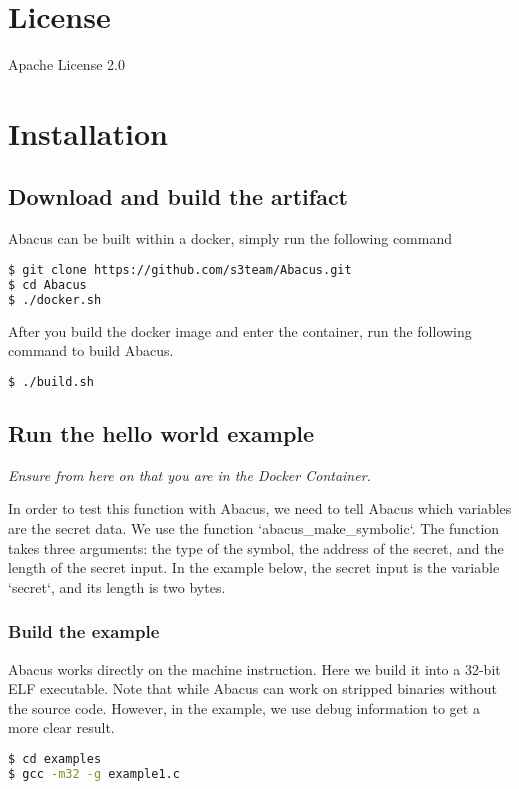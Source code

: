 \documentclass[10pt,conference]{IEEEtran}
\newcommand{\tool}{\textsf{Abacus}}
\begin{document}
\section{License}
Apache License 2.0

\section{Installation}

\subsection{Download and build the artifact}
\tool{} can be built within a docker, simply run the following command

\begin{lstlisting}[language=bash]
$ git clone https://github.com/s3team/Abacus.git
$ cd Abacus
$ ./docker.sh
\end{lstlisting}

After you build the docker image and enter the container, run the
following command to build Abacus.

\begin{lstlisting}[language=bash]
$ ./build.sh
\end{lstlisting}
\subsection{Run the hello world example}
\emph{Ensure from here on that you are in the Docker Container.}

In order to test this function with Abacus, we need to tell Abacus 
which variables are the secret data. We use the function `abacus\_make\_symbolic`. 
The function takes three arguments: the type of the symbol, the address of 
the secret, and the length of the secret input. In the example below, 
the secret input is the variable `secret`, and its length is two bytes.

\subsubsection{Build the example}

Abacus works directly on the machine instruction. Here we build it into 
a 32-bit ELF executable. Note that while Abacus can work on stripped binaries 
without the source code. However, in the example, we use debug information 
to get a more clear result.
\begin{lstlisting}[language=bash]
$ cd examples
$ gcc -m32 -g example1.c
\end{lstlisting}
\end{document}
